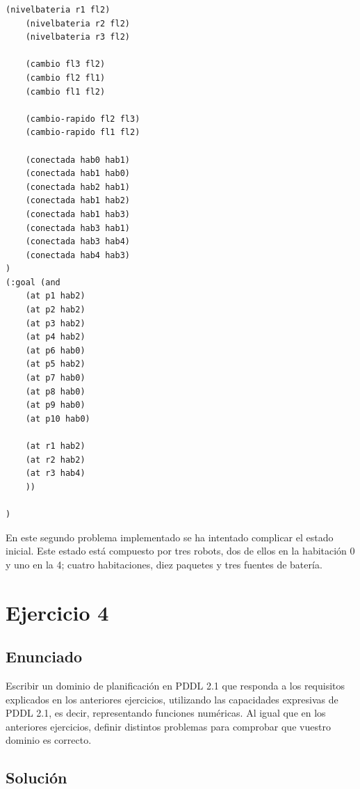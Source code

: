 \begin{itemize}
\begin{lstlisting}[language=SH]
	(nivelbateria r1 fl2)
	(nivelbateria r2 fl2)
	(nivelbateria r3 fl2)

	(cambio fl3 fl2)
	(cambio fl2 fl1)
	(cambio fl1 fl2)

	(cambio-rapido fl2 fl3)
	(cambio-rapido fl1 fl2)

	(conectada hab0 hab1)
	(conectada hab1 hab0)
	(conectada hab2 hab1)
	(conectada hab1 hab2)
	(conectada hab1 hab3)
	(conectada hab3 hab1)
	(conectada hab3 hab4)
	(conectada hab4 hab3)
)
(:goal (and
	(at p1 hab2)
	(at p2 hab2)
	(at p3 hab2)
	(at p4 hab2)
	(at p6 hab0)
	(at p5 hab2)
	(at p7 hab0)
	(at p8 hab0)
	(at p9 hab0)
	(at p10 hab0)

	(at r1 hab2)
	(at r2 hab2)
	(at r3 hab4)
	))

)

\end{lstlisting}

En este segundo problema implementado se ha intentado complicar el estado inicial. Este estado está compuesto por tres robots, dos de ellos en la habitación 0 y uno en la 4; cuatro habitaciones, diez paquetes y tres fuentes de batería.

\end{itemize}

\newpage

\section{Ejercicio 4}

\subsection{Enunciado}

Escribir  un  dominio  de  planificación  en  PDDL  2.1  que  responda  a  los  requisitos explicados  en  los  anteriores  ejercicios, utilizando  las  capacidades  expresivas  de  PDDL 2.1,  es  decir,  representando  funciones  numéricas.  Al  igual  que  en  los  anteriores ejercicios,   definir   distintos   problemas   para   comprobar   que   vuestro   dominio  es correcto.

\subsection{Solución}


